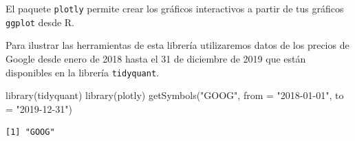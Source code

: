 \documentclass[
  letterpaper,
  DIV=11,
  numbers=noendperiod]{scrreprt}
\newenvironment{Shaded}{\begin{snugshade}}{\end{snugshade}}
\newcommand{\AttributeTok}[1]{\textcolor[rgb]{0.40,0.45,0.13}{#1}}
\newcommand{\FunctionTok}[1]{\textcolor[rgb]{0.28,0.35,0.67}{#1}}
\newcommand{\NormalTok}[1]{\textcolor[rgb]{0.00,0.23,0.31}{#1}}
\newcommand{\StringTok}[1]{\textcolor[rgb]{0.13,0.47,0.30}{#1}}
\begin{document}
El paquete \texttt{plotly} permite crear los gráficos interactivos a
partir de tus gráficos \texttt{ggplot} desde R.

Para ilustrar las herramientas de esta librería utilizaremos datos de
los precios de Google desde enero de 2018 hasta el 31 de diciembre de
2019 que están disponibles en la librería \texttt{tidyquant}.

\begin{Shaded}
\begin{Highlighting}[]
\FunctionTok{library}\NormalTok{(tidyquant)}
\FunctionTok{library}\NormalTok{(plotly)}
\FunctionTok{getSymbols}\NormalTok{(}\StringTok{"GOOG"}\NormalTok{,}
             \AttributeTok{from =} \StringTok{"2018{-}01{-}01"}\NormalTok{,}
             \AttributeTok{to =} \StringTok{"2019{-}12{-}31"}\NormalTok{)}
\end{Highlighting}
\end{Shaded}

\begin{verbatim}
[1] "GOOG"
\end{verbatim}
\end{document}
